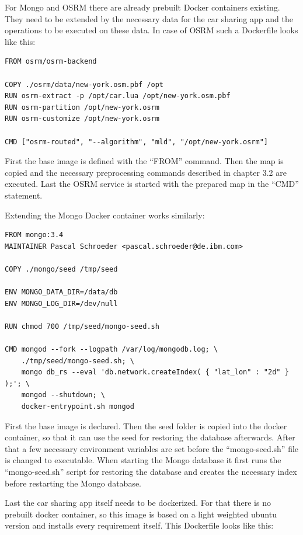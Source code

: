 For Mongo and OSRM there are already prebuilt Docker containers existing. They need to be extended by the necessary data for the car sharing app and the operations to be executed on these data. In case of OSRM such a Dockerfile looks like this:

\begin{lstlisting}
FROM osrm/osrm-backend

COPY ./osrm/data/new-york.osm.pbf /opt
RUN osrm-extract -p /opt/car.lua /opt/new-york.osm.pbf
RUN osrm-partition /opt/new-york.osrm
RUN osrm-customize /opt/new-york.osrm

CMD ["osrm-routed", "--algorithm", "mld", "/opt/new-york.osrm"]
\end{lstlisting}

First the base image is defined with the ``FROM'' command. Then the map is copied and the necessary preprocessing commands described in chapter 3.2 are executed. Last the OSRM service is started with the prepared map in the ``CMD'' statement.

Extending the Mongo Docker container works similarly:

\begin{lstlisting}
FROM mongo:3.4
MAINTAINER Pascal Schroeder <pascal.schroeder@de.ibm.com>

COPY ./mongo/seed /tmp/seed

ENV MONGO_DATA_DIR=/data/db
ENV MONGO_LOG_DIR=/dev/null

RUN chmod 700 /tmp/seed/mongo-seed.sh

CMD mongod --fork --logpath /var/log/mongodb.log; \
    ./tmp/seed/mongo-seed.sh; \
    mongo db_rs --eval 'db.network.createIndex( { "lat_lon" : "2d" } );'; \
    mongod --shutdown; \
    docker-entrypoint.sh mongod
\end{lstlisting}

First the base image is declared. Then the seed folder is copied into the docker container, so that it can use the seed for restoring the database afterwards. After that a few necessary environment variables are set before the ``mongo-seed.sh'' file is changed to executable. When starting the Mongo database it first runs the ``mongo-seed.sh'' script for restoring the database and creates the necessary index before restarting the Mongo database.

Last the car sharing app itself needs to be dockerized. For that there is no prebuilt docker container, so this image is based on a light weighted ubuntu version and installs every requirement itself. This Dockerfile looks like this:


